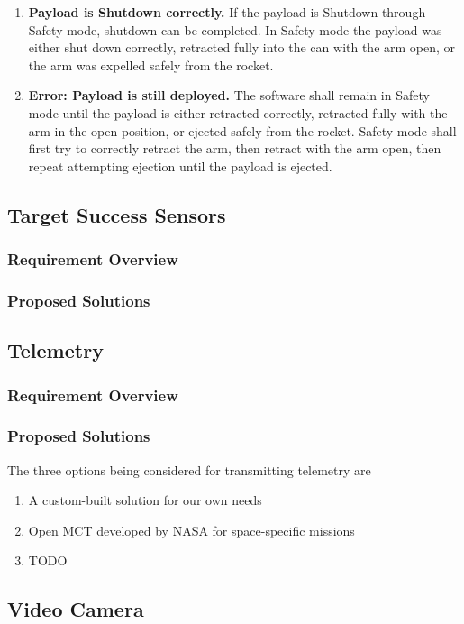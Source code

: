 \documentclass[letterpaper,10pt]{article}
\begin{document}
\begin{center}
\begin{enumerate}
\item{\textbf{Payload is Shutdown correctly.} If the payload is Shutdown through Safety mode, shutdown can be completed. In Safety mode the payload was either shut down correctly, retracted fully into the can with the arm open, or the arm was expelled safely from the rocket.}
\item{\textbf{Error: Payload is still deployed.} The software shall remain in Safety mode until the payload is either retracted correctly, retracted fully with the arm in the open position, or ejected safely from the rocket. Safety mode shall first try to correctly retract the arm, then retract with the arm open, then repeat attempting ejection until the payload is ejected.}
\end{enumerate}
\end{center}

\subsection{Target Success Sensors}
\subsubsection{Requirement Overview}
\subsubsection{Proposed Solutions}
\subsection{Telemetry}
\subsubsection{Requirement Overview}
\subsubsection{Proposed Solutions}
The three options being considered for transmitting telemetry are
\begin{enumerate}
\item{A custom-built solution for our own needs}
\item{Open MCT developed by NASA for space-specific missions}
\item{TODO} 
\end{enumerate}
\subsection{Video Camera}
\end{document}
